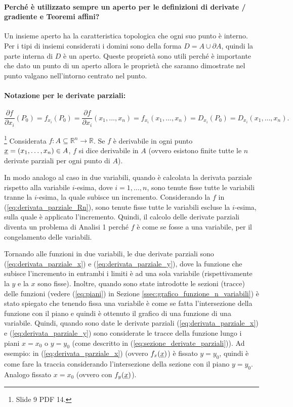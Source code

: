 \paragraph{Perché è utilizzato sempre un aperto per le definizioni di derivate / gradiente e Teoremi affini?} Un insieme aperto ha la caratteristica topologica che ogni suo punto è interno. Per i tipi di insiemi considerati i domini sono della forma $D=A\cup\partial A$, quindi la parte interna di $D$ è un aperto. Queste proprietà sono utili perché è importante che dato un punto di un aperto allora le proprietà che saranno dimostrate nel punto valgano nell'intorno centrato nel punto.

\paragraph{Notazione per le derivate parziali:}
\begin{equation*}
    \frac{\partial f}{\partial x_i}(P_0)=f_{x_i}(P_0)=\frac{\partial f}{\partial x_i}(x_1,\hdots,x_n)=f_{x_i}(x_1,\hdots,x_n)=  D_{x_i}(P_0)=D_{x_i}(x_1,\hdots,x_n).
\end{equation*}

\begin{definition}[Derivabilità in $A$]\footnote{Slide 9 PDF 14.}
   Considerata $f:A\subseteq\mathbb R^n\rightarrow\mathbb R$. Se $f$ è derivabile in ogni punto $\uline x=(x_1,\hdots,x_n)\in A$, $f$ si dice derivabile in $A$ (ovvero esistono finite tutte le $n$ derivate parziali per ogni punto di $A$).
\end{definition}

In modo analogo al caso in due variabili, quando è calcolata la derivata parziale rispetto alla variabile $i$-esima, dove $i=1,\hdots,n$, sono tenute fisse tutte le variabili tranne la $i$-esima, la quale subisce un incremento. Considerando la $f$ in (\ref{eq:derivata_parziale_Rn}), sono tenute fisse tutte le variabili escluse la $i$-esima, sulla quale è applicato l'incremento. Quindi, il calcolo delle derivate parziali diventa un problema di Analisi 1 perché $f$ è come se fosse a una variabile, per il congelamento delle variabili.

Tornando alle funzioni in due variabili, le due derivate parziali sono (\ref{eq:derivata_parziale_x}) e (\ref{eq:derivata_parziale_y}), dove la funzione che subisce l'incremento in entrambi i limiti è ad una sola variabile (rispettivamente la $y$ e la $x$ sono fisse). Inoltre, quando sono state introdotte le sezioni (tracce) delle funzioni (vedere (\ref{eq:piani}) in Sezione \ref{ssec:grafico_funzione_n_variabili}) è stato spiegato che tenendo fissa una variabile è come se fatta l'intersezione della funzione con il piano e quindi è ottenuto il grafico di una funzione di una variabile. Quindi, quando sono date le derivate parziali (\ref{eq:derivata_parziale_x}) e (\ref{eq:derivata_parziale_y}) sono considerate le tracce della funzione lungo i piani $x=x_0$ o $y=y_0$ (come descritto in (\ref{eq:sezione_derivate_parziali})). Ad esempio: in (\ref{eq:derivata_parziale_x}) (ovvero $f_x(\uline x)$) è fissato $y=y_0$, quindi è come fare la traccia considerando l'intersezione della sezione con il piano $y=y_0$. Analogo fissato $x=x_0$ (ovvero con $f_y(\uline x)$).

